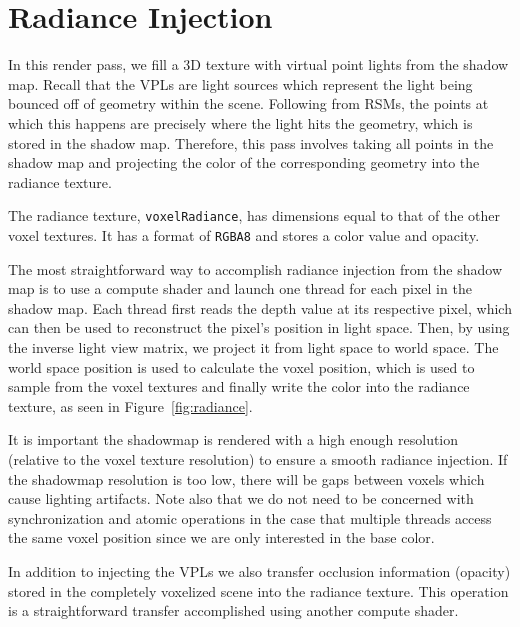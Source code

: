 \section{Radiance Injection}
In this render pass, we fill a 3D texture with virtual point lights from the shadow map. Recall that the VPLs are light sources which represent the light being bounced off of geometry within the scene. Following from RSMs, the points at which this happens are precisely where the light hits the geometry, which is stored in the shadow map. Therefore, this pass involves taking all points in the shadow map and projecting the color of the corresponding geometry into the radiance texture.

The radiance texture, \texttt{voxelRadiance}, has dimensions equal to that of the other voxel textures. It has a format of \texttt{RGBA8} and stores a color value and opacity.

The most straightforward way to accomplish radiance injection from the shadow map is to use a compute shader and launch one thread for each pixel in the shadow map. Each thread first reads the depth value at its respective pixel, which can then be used to reconstruct the pixel's position in light space. Then, by using the inverse light view matrix, we project it from light space to world space. The world space position is used to calculate the voxel position, which is used to sample from the voxel textures and finally write the color into the radiance texture, as seen in Figure~\ref{fig:radiance}.

It is important the shadowmap is rendered with a high enough resolution (relative to the voxel texture resolution) to ensure a smooth radiance injection. If the shadowmap resolution is too low, there will be gaps between voxels which cause lighting artifacts. Note also that we do not need to be concerned with synchronization and atomic operations in the case that multiple threads access the same voxel position since we are only interested in the base color.

In addition to injecting the VPLs we also transfer occlusion information (opacity) stored in the completely voxelized scene into the radiance texture. This operation is a straightforward transfer accomplished using another compute shader.



